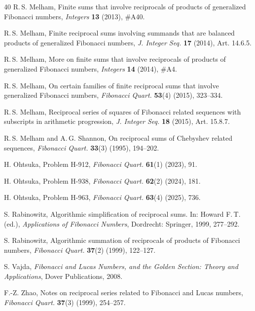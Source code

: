 \documentclass[12pt,reqno]{article}
\begin{document}
\begin{thebibliography}{40}
R.\,S. Melham, Finite sums that involve reciprocals of products of generalized Fibonacci numbers, \textit{{Integers}} \textbf{13} (2013), \#A40.

R.\,S. Melham, Finite reciprocal sums involving summands that are balanced products of generalized Fibonacci numbers, \textit{J. Integer Seq.} 
\textbf{17} (2014), Art. 14.6.5.

R.\,S. Melham, More on finite sums that involve reciprocals of products of generalized Fibonacci numbers, \textit{Integers} \textbf{14} (2014), \#A4.

R.\,S. Melham, On certain families of finite reciprocal sums that involve generalized Fibonacci numbers, \textit{Fibonacci Quart.} \textbf{53}(4) (2015), 323--334.

R.\,S. Melham, Reciprocal series of squares of Fibonacci related sequences with subscripts in arithmetic progression, \textit{J. Integer Seq.} \textbf{18} (2015), Art. 15.8.7.

R.\,S. Melham and A.\,G. Shannon, On reciprocal sums of Chebyshev related sequences, \textit{Fibonacci Quart.} \textbf{33}(3) (1995), 194--202.

H. Ohtsuka, Problem H-912, \textit{
	Fibonacci Quart.} \textbf{61}(1) (2023), 91.

H. Ohtsuka, Problem H-938, 
\textit{Fibonacci Quart.} \textbf{62}(2) (2024), 181.

H. Ohtsuka, Problem H-963, 
\textit{Fibonacci Quart.} \textbf{63}(4) (2025), 736.


S. Rabinowitz,  Algorithmic simplification of reciprocal sums. In: Howard F.\,T. (ed.), \textit{Applications of Fibonacci Numbers}, Dordrecht: Springer, 1999, 277--292.

S. Rabinowitz, Algorithmic summation of reciprocals of products of Fibonacci numbers, \textit{Fibonacci Quart.} \textbf{37}(2) (1999), 122--127.



S. Vajda, \textit{Fibonacci and Lucas Numbers, and the Golden Section: Theory and Applications},
Dover Publications, 2008.


F.-Z. Zhao,  Notes on reciprocal series related to Fibonacci and Lucas numbers, \textit{Fibonacci Quart.} \textbf{37}(3) (1999), 254--257.

\end{thebibliography}
\end{document}
